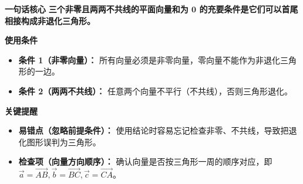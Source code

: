 \begin{summarybox}
	\textbf{\textcolor{CSummary}{一句话核心}}
	\textbf{三个非零且两两不共线的平面向量和为 $\mathbf{0}$ 的充要条件是它们可以首尾相接构成非退化三角形。}

	\medskip
	\textbf{\textcolor{CSummary}{使用条件}}
	\begin{itemize}[leftmargin=*, itemsep=0.5em, topsep=0.4em]
		\item \textbf{条件 1（非零向量）：} 所有向量必须是非零向量，零向量不能作为非退化三角形的一边。
		\item \textbf{条件 2（两两不共线）：} 任意两个向量不平行（不共线），否则三角形退化。
	\end{itemize}

	\medskip
	\textbf{\textcolor{CSummary}{关键提醒}}
	\begin{itemize}[leftmargin=*, itemsep=0.5em, topsep=0.4em]
		\item \textbf{易错点（忽略前提条件）：} 使用结论时容易忘记检查非零、不共线，导致把退化图形误判为三角形。
		\item \textbf{检查项（向量方向顺序）：} 确认向量是否按三角形一周的顺序对应，即 $\vec{a}=\overrightarrow{AB},\vec{b}=\overrightarrow{BC},\vec{c}=\overrightarrow{CA}$。
	\end{itemize}

\end{summarybox}